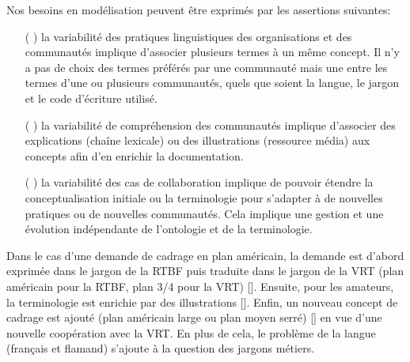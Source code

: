 Nos besoins en modélisation peuvent être exprimés par les assertions suivantes:
\begin{enumerate}
	\item[(\e{A1}]) la variabilité des pratiques linguistiques des organisations et des communautés implique d'associer plusieurs termes à un même concept. 
	Il n'y a pas de choix des termes préférés par une communauté mais une  entre les termes d'une ou plusieurs communautés, quels que soient la langue, le jargon et le code d'écriture utilisé.
	
	\item[(\e{A2}]) la variabilité de compréhension des communautés implique d'associer des explications (chaîne lexicale) ou des illustrations (ressource média) aux concepts afin d'en enrichir la documentation. 
	
	\item[(\e{A3}]) la variabilité des cas de collaboration implique de pouvoir étendre la conceptualisation initiale ou la terminologie pour s'adapter à de nouvelles pratiques ou de nouvelles communautés. 
	Cela implique une gestion et une évolution indépendante de l'ontologie et de la terminologie. 
\end{enumerate}


Dans le cas d'une demande de cadrage en plan américain, la demande est d'abord exprimée dans le jargon de la RTBF puis traduite dans le jargon de la VRT (plan américain pour la RTBF, plan 3/4 pour la VRT) []. 
Ensuite, pour les amateurs, la terminologie est enrichie par des illustrations []. Enfin, un nouveau concept de cadrage est ajouté (plan américain large ou plan moyen serré) [] en vue d'une nouvelle coopération avec la VRT. En plus de cela, le problème de la langue (français et flamand) s'ajoute à la question des jargons métiers. 
